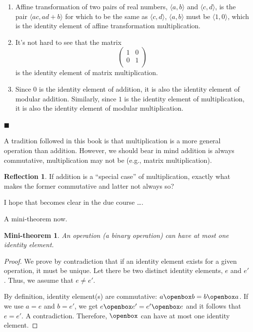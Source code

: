 \documentclass[english,notitlepage,smartquotes]{hgbreport}
\theoremstyle{definition}
\theoremstyle{definition}
\theoremstyle{remark}
\theoremstyle{plain}
\newtheorem{mini-theorem}{Mini-theorem}
\theoremstyle{definition}
\renewcommand\qedsymbol{$\blacksquare$}
\theoremstyle{definition}
\newtheorem{reflection}{Reflection}
\begin{document}
\begin{enumerate}
\item\label{item:affine} Affine transformation of two pairs of real numbers, $\langle a,b\rangle$ and $\langle c,d\rangle$, is the pair $\langle ac,ad+b\rangle$ for which to be the same as $\langle c,d\rangle$, $\langle a,b\rangle$ must be $\langle 1,0\rangle$, which is the identity element of affine transformation multiplication.
\item It's not hard to see that the matrix
\[
  \begin{pmatrix}
    1 & 0\\
    0 & 1\\
  \end{pmatrix}
\] 
is the identity element of matrix multiplication.
\item Since $0$ is the identity element of addition, it is also the identity element of modular addition. Similarly, since $1$ is the identity element of multiplication, it is also the identity element of modular multiplication. 
\end{enumerate}

\qedsymbol

A tradition followed in this book is that multiplication is a more general operation than addition. However, we should bear in mind addition is always commutative, multiplication may not be (e.g., matrix multiplication). 

\begin{reflection}
If addition is a ``special case'' of multiplication, exactly what makes the former commutative and latter not always so?

I hope that becomes clear in the due course \dots.
\end{reflection}

A mini-theorem now.
\begin{mini-theorem}
An operation (a binary operation) can have at most one identity element.
\end{mini-theorem}
\begin{proof}
We prove by contradiction that if an identity element exists for a given operation, it must be unique. Let there be two distinct identity elements, $e$ and $e'$. Thus, we assume that $e\ne e'$.

By definition, identity element(s) are commutative: $a\openbox b=b\openbox a$. If we use $a=e$ and $b=e'$, we get $e\openbox e'=e'\openbox e$ and it follows that $e=e'$. A contradiction. Therefore, $\openbox$ can have at most one identity element.
\end{proof}
\end{document}
